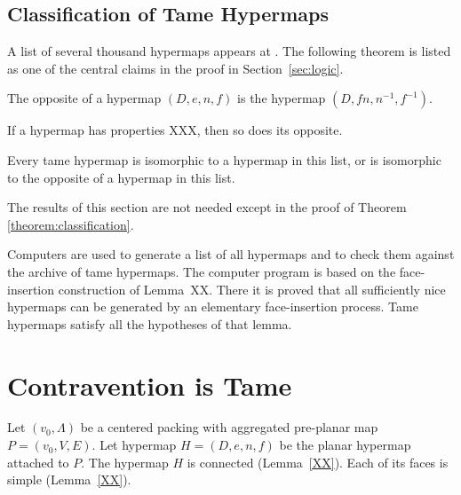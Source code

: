 \subsection{Classification of Tame Hypermaps}
    \label{sec:proof-classification}

\label{sec:classification}

A list of several thousand hypermaps appears at \cite{web}. The
following theorem is listed as one of the central claims in the
proof in Section~\ref{sec:logic}.

\begin{definition} The opposite of a hypermap $(D,e,n,f)$ is the
hypermap $(D,f n,n^{-1},f^{-1})$.
\end{definition}

\begin{lemma} If a hypermap has properties XXX, then so does its
opposite.
\end{lemma}

\begin{theorem}
\label{theorem:classification} Every tame hypermap is isomorphic to
a hypermap in this list, or is isomorphic to the opposite of a
hypermap in this list.
\end{theorem}

The results of this section are not needed except in the proof of
Theorem \ref{theorem:classification}.

\smallskip

Computers are used to generate a list of all hypermaps and to check
them against the archive of tame hypermaps.  The computer program is
based on the face-insertion construction of Lemma~XX.  There it is
proved that all sufficiently nice hypermaps can be generated by an
elementary face-insertion process.  Tame hypermaps satisfy all the
hypotheses of that lemma.





\section{Contravention is Tame}
    \label{sec:contraproof}

Let $(v_0,\Lambda)$ be a centered packing with
aggregated pre-planar map $P=(v_0,V,E)$.  Let  hypermap $H=(D,e,n,f)$
be the planar hypermap attached to $P$.
The hypermap $H$ is connected (Lemma~\ref{XX}).  Each of its
faces is simple (Lemma~\ref{XX}).


